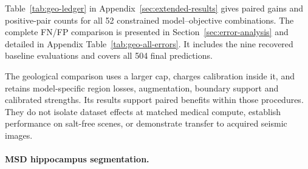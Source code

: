 \documentclass[12pt,a4paper]{article}
\begin{document}
Table~\ref{tab:geo-ledger} in Appendix~\ref{sec:extended-results}
gives paired gains and positive-pair counts for all 52 constrained
model--objective combinations. The complete FN/FP comparison is presented in
Section~\ref{sec:error-analysis} and detailed in Appendix
Table~\ref{tab:geo-all-errors}.
It includes the nine recovered baseline evaluations and covers all
504 final predictions.

The geological comparison uses a larger cap, charges calibration
inside it, and retains model-specific region losses, augmentation,
boundary support and calibrated strengths. Its results support paired
benefits within those procedures. They do not isolate dataset effects
at matched medical compute, establish performance on salt-free scenes,
or demonstrate transfer to acquired seismic images.

\FloatBarrier

\paragraph{MSD hippocampus segmentation.}
\label{sec:main-msd-results}
\end{document}
